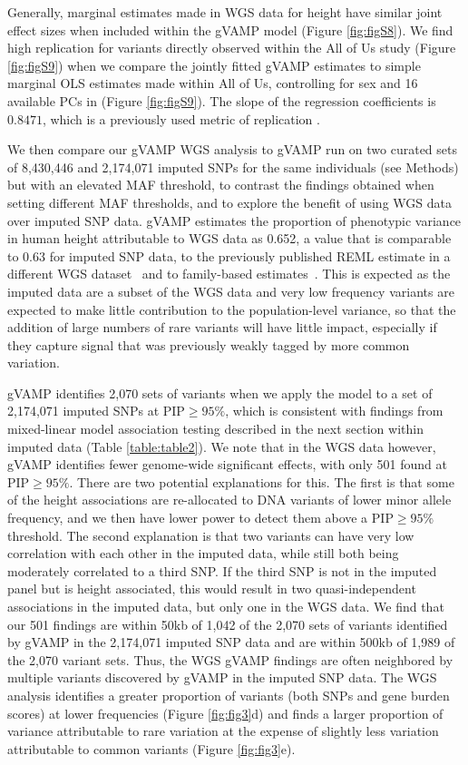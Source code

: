 Generally, marginal estimates made in WGS data for height have similar joint effect sizes when included within the gVAMP model (Figure \ref{fig:figS8}). We find high replication for variants directly observed within the All of Us study (Figure \ref{fig:figS9}) when we compare the jointly fitted gVAMP estimates to simple marginal OLS estimates made within All of Us, controlling for sex and 16 available PCs in (Figure \ref{fig:figS9}). The slope of the regression coefficients is $0.8471$, which is a previously used metric of replication \cite{yengo_meta-analysis_2018}.

We then compare our gVAMP WGS analysis to gVAMP run on two curated sets of 8,430,446 and 2,174,071 imputed SNPs for the same individuals (see Methods) but with an elevated MAF threshold, to contrast the findings obtained when setting different MAF thresholds, and to explore the benefit of using WGS data over imputed SNP data. gVAMP estimates the proportion of phenotypic variance in human height attributable to WGS data as 0.652, a value that is comparable to 0.63 for imputed SNP data, to the previously published REML estimate in a different WGS dataset~\cite{Wainschtein} and to family-based estimates~\cite{robinson2017}. This is expected as the imputed data are a subset of the WGS data and very low frequency variants are expected to make little contribution to the population-level variance, so that the addition of large numbers of rare variants will have little impact, especially if they capture signal that was previously weakly tagged by more common variation. 

gVAMP identifies 2,070 sets of variants when we apply the model to a set of 2,174,071 imputed SNPs at $\text{PIP}\ge 95\%$, which is consistent with findings from mixed-linear model association testing described in the next section within imputed data (Table \ref{table:table2}). We note that in the WGS data however, gVAMP identifies fewer genome-wide significant effects, with only 501 found at $\text{PIP}\ge 95\%$. There are two potential explanations for this. The first is that some of the height associations are re-allocated to DNA variants of lower minor allele frequency, and we then have lower power to detect them above a $\text{PIP}\ge 95\%$ threshold. The second explanation is that two variants can have very low correlation with each other in the imputed data, while still both being moderately correlated to a third SNP. If the third SNP is not in the imputed panel but is height associated, this would result in two quasi-independent associations in the imputed data, but only one in the WGS data. We find that our 501 findings are within 50kb of 1,042 of the 2,070 sets of variants identified by gVAMP in the 2,174,071 imputed SNP data and are within 500kb of 1,989 of the 2,070 variant sets. Thus, the WGS gVAMP findings are often neighbored by multiple variants discovered by gVAMP in the imputed SNP data. The WGS analysis identifies a greater proportion of variants (both SNPs and gene burden scores) at lower frequencies (Figure \ref{fig:fig3}d) and finds a larger proportion of variance attributable to rare variation at the expense of slightly less variation attributable to common variants (Figure \ref{fig:fig3}e). 

